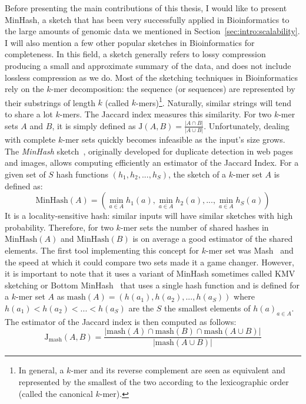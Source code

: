 Before presenting the main contributions of this thesis, I would like to present MinHash, a sketch that has been very successfully applied in Bioinformatics to the large amounts of genomic data we mentioned in Section~\ref{sec:intro:scalability}. I will also mention a few other popular sketches in Bioinformatics for completeness. 
In this field, a sketch generally refers to lossy compression producing a small and approximate summary of the data, and does not include lossless compression as we do.
Most of the sketching techniques in Bioinformatics rely on the $k$-mer decomposition: the sequence (or sequences) are represented by their substrings of length $k$ (called $k$-mers)\footnote{In general, a $k$-mer and its reverse complement are seen as equivalent and represented by the smallest of the two according to the lexicographic order (called the canonical $k$-mer).}.
Naturally, similar strings will tend to share a lot $k$-mers. The Jaccard index measures this similarity. For two $k$-mer sets $A$ and $B$, it is simply defined as $ \mathrm{J}(A,B) = \frac{|A\cap B|}{|A \cup B|} $.
Unfortunately, dealing with complete $k$-mer sets quickly becomes infeasible as the input's size grows. 
The \textit{MinHash} sketch~\cite{MinHash97}, originally developed for duplicate detection in web pages and images, allows computing efficiently an estimator of the Jaccard Index. 
For a given set of $S$ hash functions $(h_1,h_2,...,h_S)$, the sketch of a $k$-mer set $A$ is defined as: $$ \mathrm{MinHash}(A) = (\min_{a \in A} h_1(a), \min_{a \in A} h_2(a), ..., \min_{a \in A} h_S(a) ) $$
%
It is a locality-sensitive hash: similar inputs will have similar sketches with high probability. Therefore, for two $k$-mer sets the number of shared hashes in $\mathrm{MinHash}(A)$ and $\mathrm{MinHash}(B)$ is on average a good estimator of the shared elements.
The first tool implementing this concept for $k$-mer set was Mash~\cite{ondov2016mash} and the speed at which it could compare two sets made it a game changer. However, it is important to note that it uses a variant of MinHash sometimes called KMV sketching or Bottom MinHash~\cite{bar2002counting} that uses a single hash function and is defined for a $k$-mer set $A$ as $\mathrm{mash}(A)=(h(a_1),h(a_2),...,h(a_S))$ where $h(a_1) < h(a_2) < ... <h(a_S)$ are the $S$ the smallest elements of ${h(a)}_{a\in A}$.
The estimator of the Jaccard index is then computed as follows: $$ \mathrm{J}_{\mathrm{mash}}(A,B) = \frac{|\mathrm{mash}(A)\cap \mathrm{mash}(B) \cap \mathrm{mash}(A \cup B) |}{|\mathrm{mash}(A \cup B)|}$$
